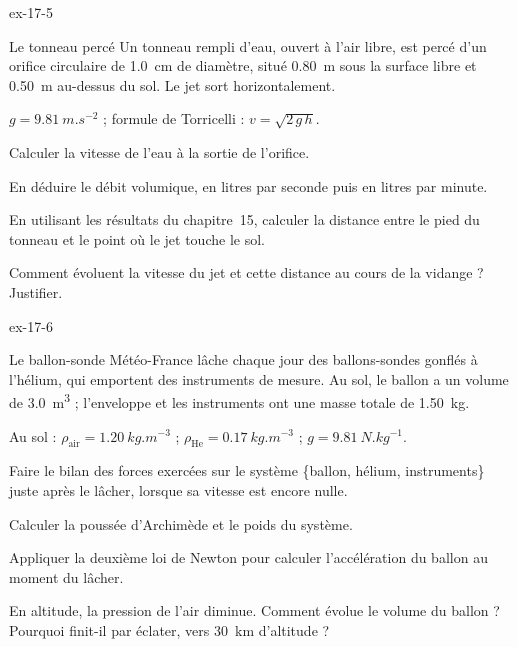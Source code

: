 \begin{blocLivre}{ex-17-5}
\begin{exercice}[1]{Le tonneau percé}
Un tonneau rempli d'eau, ouvert à l'air libre, est percé d'un orifice circulaire de \qty{1,0}{cm} de diamètre, situé
\qty{0,80}{m} sous la surface libre et \qty{0,50}{m} au-dessus du sol. Le jet sort horizontalement.
\begin{donnees}
$g=\qty{9,81}{m.s^{-2}}$ ; formule de Torricelli : $v=\sqrt{2\,g\,h}$.
\end{donnees}
\begin{questions}
\item Calculer la vitesse de l'eau à la sortie de l'orifice.
\item En déduire le débit volumique, en litres par seconde puis en litres par minute.
\item En utilisant les résultats du chapitre~15, calculer la distance entre le pied du tonneau et le point où le jet
touche le sol.
\item Comment évoluent la vitesse du jet et cette distance au cours de la vidange ? Justifier.
\end{questions}
\end{exercice}
\end{blocLivre}
\begin{blocLivre}{ex-17-6}
\begin{exercice}[2]{Le ballon-sonde}
Météo-France lâche chaque jour des ballons-sondes gonflés à l'hélium, qui emportent des instruments de mesure. Au sol,
le ballon a un volume de \qty{3,0}{m^3} ; l'enveloppe et les instruments ont une masse totale de \qty{1,50}{kg}.
\begin{donnees}
Au sol : $\rho_\mathrm{air}=\qty{1,20}{kg.m^{-3}}$ ; $\rho_\mathrm{He}=\qty{0,17}{kg.m^{-3}}$ ; $g=\qty{9,81}{N.kg^{-1}}$.
\end{donnees}
\begin{questions}
\item Faire le bilan des forces exercées sur le système \{ballon, hélium, instruments\} juste après le lâcher, lorsque
sa vitesse est encore nulle.
\item Calculer la poussée d'Archimède et le poids du système.
\item Appliquer la deuxième loi de Newton pour calculer l'accélération du ballon au moment du lâcher.
\item En altitude, la pression de l'air diminue. Comment évolue le volume du ballon ? Pourquoi finit-il par éclater,
vers \qty{30}{km} d'altitude ?
\end{questions}
\end{exercice}
\end{blocLivre}
